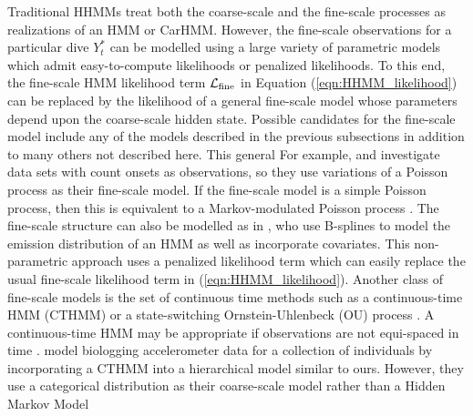 Traditional HHMMs treat both the coarse-scale and the fine-scale processes as realizations of an HMM or CarHMM. 
However, the fine-scale observations for a particular dive $Y^*_t$ can be modelled using a large variety of parametric models which admit easy-to-compute likelihoods or penalized likelihoods. To this end, the fine-scale HMM likelihood term $\mathcal{L}_{\text{fine}}$ in Equation (\ref{eqn:HHMM_likelihood}) can be replaced by the likelihood of a general fine-scale model whose parameters depend upon the coarse-scale hidden state.
%
Possible candidates for the fine-scale model include any of the models described in the previous subsections in addition to many others not described here. 
This general For example, \citet{Bebbington:2007} and \citet{Borchers:2013} investigate data sets with count onsets as observations, so they use variations of a Poisson process as their fine-scale model. If the fine-scale model is a simple Poisson process, then this is equivalent to a Markov-modulated Poisson process \citep{Fischer:1993}.
The fine-scale structure can also be modelled as in \citep{Langrock:2018}, who use B-splines to model the emission distribution of an HMM as well as incorporate covariates. This non-parametric approach uses a penalized likelihood term which can easily replace the usual fine-scale likelihood term in (\ref{eqn:HHMM_likelihood}). 
Another class of fine-scale models is the set of continuous time methods such as a continuous-time HMM (CTHMM) \citep{Liu:2015} or a state-switching Ornstein-Uhlenbeck (OU) process \citep{Michelot:2019}. 
A continuous-time HMM may be appropriate if observations are not equi-spaced in time \citep{Liu:2015}. \citet{Xu:2018} model biologging accelerometer data for a collection of individuals by incorporating a CTHMM into a hierarchical model similar to ours. However, they use a categorical distribution as their coarse-scale model rather than a Hidden Markov Model

